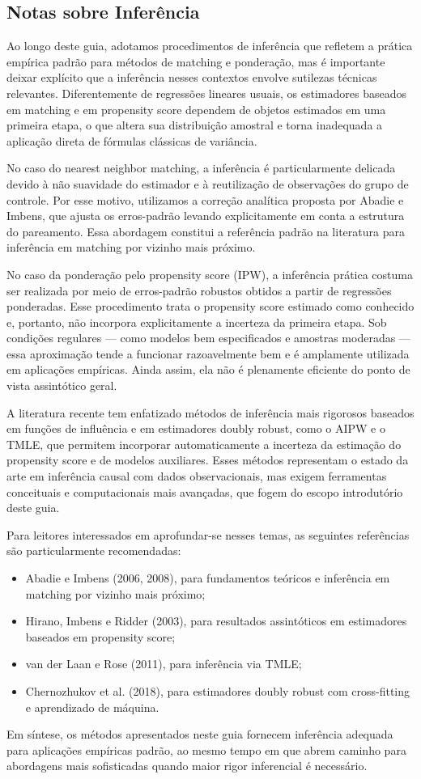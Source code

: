 \subsection{Notas sobre Inferência}

Ao longo deste guia, adotamos procedimentos de inferência que refletem a prática empírica padrão para métodos de matching e ponderação, mas é importante deixar explícito que a inferência nesses contextos envolve sutilezas técnicas relevantes. Diferentemente de regressões lineares usuais, os estimadores baseados em matching e em propensity score dependem de objetos estimados em uma primeira etapa, o que altera sua distribuição amostral e torna inadequada a aplicação direta de fórmulas clássicas de variância.

No caso do nearest neighbor matching, a inferência é particularmente delicada devido à não suavidade do estimador e à reutilização de observações do grupo de controle. Por esse motivo, utilizamos a correção analítica proposta por Abadie e Imbens, que ajusta os erros-padrão levando explicitamente em conta a estrutura do pareamento. Essa abordagem constitui a referência padrão na literatura para inferência em matching por vizinho mais próximo.

No caso da ponderação pelo propensity score (IPW), a inferência prática costuma ser realizada por meio de erros-padrão robustos obtidos a partir de regressões ponderadas. Esse procedimento trata o propensity score estimado como conhecido e, portanto, não incorpora explicitamente a incerteza da primeira etapa. Sob condições regulares — como modelos bem especificados e amostras moderadas — essa aproximação tende a funcionar razoavelmente bem e é amplamente utilizada em aplicações empíricas. Ainda assim, ela não é plenamente eficiente do ponto de vista assintótico geral.

A literatura recente tem enfatizado métodos de inferência mais rigorosos baseados em funções de influência e em estimadores doubly robust, como o AIPW e o TMLE, que permitem incorporar automaticamente a incerteza da estimação do propensity score e de modelos auxiliares. Esses métodos representam o estado da arte em inferência causal com dados observacionais, mas exigem ferramentas conceituais e computacionais mais avançadas, que fogem do escopo introdutório deste guia.

Para leitores interessados em aprofundar-se nesses temas, as seguintes referências são particularmente recomendadas:


\begin{itemize}
    \item Abadie e Imbens (2006, 2008), para fundamentos teóricos e inferência em matching por vizinho mais próximo;

\item Hirano, Imbens e Ridder (2003), para resultados assintóticos em estimadores baseados em propensity score;

\item van der Laan e Rose (2011), para inferência via TMLE;

\item Chernozhukov et al. (2018), para estimadores doubly robust com cross-fitting e aprendizado de máquina.
\end{itemize}

Em síntese, os métodos apresentados neste guia fornecem inferência adequada para aplicações empíricas padrão, ao mesmo tempo em que abrem caminho para abordagens mais sofisticadas quando maior rigor inferencial é necessário.
